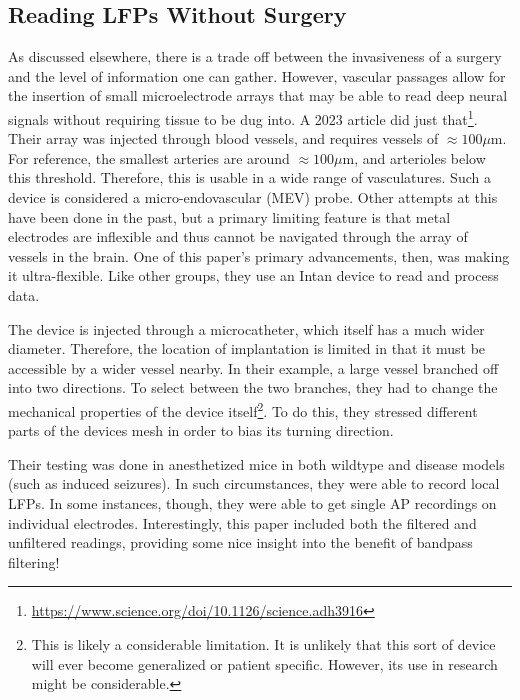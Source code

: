 \subsection{Reading LFPs Without Surgery}

As discussed elsewhere, there is a trade off between the invasiveness of a surgery and the level of information one can gather. However, vascular passages allow for the insertion of small microelectrode arrays that may be able to read deep neural signals without requiring tissue to be dug into. A 2023 article did just that\footnote{\url{https://www.science.org/doi/10.1126/science.adh3916}}. Their array was injected through blood vessels, and requires vessels of $\approx 100 \mu$m. For reference, the smallest arteries are around $\approx 100 \mu$m, and arterioles below this threshold. Therefore, this is usable in a wide range of vasculatures. Such a device is considered a micro-endovascular (MEV) probe. Other attempts at this have been done in the past, but a primary limiting feature is that metal electrodes are inflexible and thus cannot be navigated through the array of vessels in the brain. One of this paper's primary advancements, then, was making it ultra-flexible. Like other groups, they use an Intan device to read and process data.\newline

The device is injected through a microcatheter, which itself has a much wider diameter. Therefore, the location of implantation is limited in that it must be accessible by a wider vessel nearby. In their example, a large vessel branched off into two directions. To select between the two branches, they had to change the mechanical properties of the device itself\footnote{This is likely a considerable limitation. It is unlikely that this sort of device will ever become generalized or patient specific. However, its use in research might be considerable.}. To do this, they stressed different parts of the devices mesh in order to bias its turning direction.\newline

Their testing was done in anesthetized mice in both wildtype and disease models (such as induced seizures). In such circumstances, they were able to record local LFPs. In some instances, though, they were able to get single AP recordings on individual electrodes. Interestingly, this paper included both the filtered and unfiltered readings, providing some nice insight into the benefit of bandpass filtering!\newline

